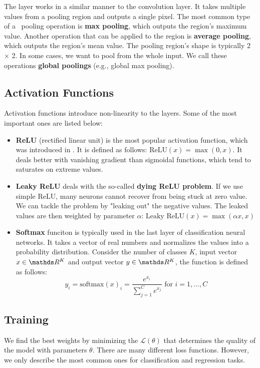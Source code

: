 The layer works in a similar manner to the convolution layer. It takes multiple
values from a pooling region and outputs a single pixel. The most common type of
a~ pooling operation is \textbf{max pooling}, which outputs the region's
maximum value. Another operation that can be applied to the region is
\textbf{average pooling}, which outputs the region's mean value. The pooling
region's shape is typically 2 $\times$ 2. In some cases, we want to
pool from the whole input. We call these operations \textbf{global poolings}
(e.g., global max pooling).

\subsection{Activation Functions}
\label{afunctions}

Activation functions introduce non-linearity to the layers. Some of the most
important ones are listed below:
\begin{itemize}
    \item \textbf{ReLU} (rectified linear unit) is the most popular activation
          function, which was introduced in \cite{pmlr-v15-glorot11a}. It is defined
          as follows: $\text{ReLU}(x) = \max(0, x)$. It deals better with vanishing
          gradient than sigmoidal functions, which tend to saturates on extreme values.
    \item \textbf{Leaky ReLU} deals with the so-called
          \textbf{dying ReLU problem}. If we use simple ReLU, many neurons cannot
          recover from being stuck at zero value. We can tackle the problem by
          "leaking out" the negative values. The leaked values are then weighted by
          parameter $\alpha$: $\text{Leaky ReLU}(x) = \max(\alpha x, x)$
    \item \textbf{Softmax} funciton is typically used in the last layer of
          classification neural networks. It takes a vector of real numbers and
          normalizes the values into a probability distribution. Consider the number of classes $K$, 
          input vector$x \in \real^K$ and output vector $y \in \real^K$, the function is defined
          as follows:
          $$
              y_i = \text{softmax}(x)_i = \frac{e^{x_i}}{\sum\limits^{C}_{j = 1}
                  e^{x_j}} \text{ for } i = 1,...,C
          $$
\end{itemize}

\subsection{Training}
\label{sec:training}
We find the best weights by minimizing the  $\mathcal{L(\theta)}$
that determines the quality of the model with parameters $\theta$. There are
many different loss functions. However, we only describe the most common ones
for classification and regression tasks.

